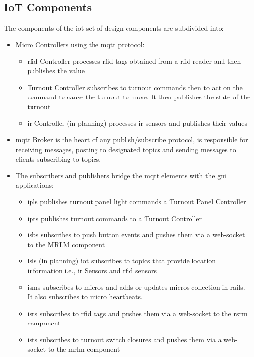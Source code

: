 \subsection{IoT Components}
The components of the \gls{iot} set of design components are subdivided into:
\begin{itemize}
  \item Micro Controllers using the \gls{mqtt} protocol:
\begin{itemize}
  \item \gls{rfid} Controller processes \gls{rfid} tags obtained from a \gls{rfid} reader and then publishes the value
  \item Turnout Controller subscribes to turnout commands then to act on the command to cause the turnout to move. It then publishes the state of the turnout
  \item \gls{ir} Controller (in planning) processes \gls{ir} sensors and publishes their values
\end{itemize}
  \item \gls{mqtt} Broker is the heart of any publish/subscribe protocol, is responsible for receiving messages, posting to designated topics and sending messages to clients subscribing to topics.
  \item The subscribers and publishers bridge the \gls{mqtt} elements with the \gls{gui} applications:
\begin{itemize}
  \item \gls{ipls} publishes turnout panel light commands a Turnout Panel Controller
  \item \gls{ipts} publishes turnout commands to a Turnout Controller
  \item \gls{isbs}  subscribes to push button events and pushes them via a web-socket to the MRLM component
  \item \gls{isls} (in planning) \gls{iot} subscribes to topics that provide location information i.e., \gls{ir} Sensors and \gls{rfid} sensors
  \item \gls{isms} subscribes to micros and adds or updates micros collection in \gls{rails}. It also subscribes to micro heartbeats.
  \item \gls{isrs} subscribes to \gls{rfid} tags and pushes them via a web-socket to the \gls{rsrm} component
  \item \gls{ists} subscribes to turnout switch closures and pushes them via a web-socket to the \gls{mrlm} component
\end{itemize}
\end{itemize}
